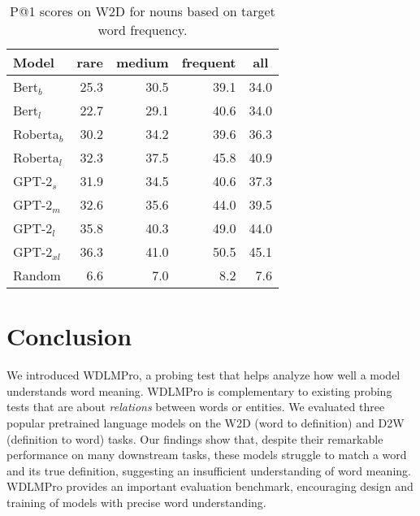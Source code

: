 \documentclass[11pt,a4paper]{article}
\begin{document}
\begin{table}
    \centering
    \begin{tabular}{l|rrrr}
    \hline
         \textbf{Model} & \multicolumn{1}{c}{\textbf{rare}} & \multicolumn{1}{c}{\textbf{medium}} & \multicolumn{1}{c}{\textbf{frequent}} & \multicolumn{1}{c}{\textbf{all}} \\ \hline
     Bert$_{b}$ & 25.3 & 30.5 & 39.1 & 34.0 \\
     Bert$_{l}$ & 22.7 & 29.1 & 40.6 & 34.0 \\
     Roberta$_{b}$ & 30.2 & 34.2 & 39.6 & 36.3 \\
     Roberta$_{l}$ & 32.3 & 37.5 & 45.8 & 40.9 \\ \hline
     GPT-2$_{s}$ & 31.9 & 34.5 & 40.6 & 37.3 \\
     GPT-2$_{m}$ & 32.6 & 35.6 & 44.0 & 39.5 \\
     GPT-2$_{l}$ & 35.8 & 40.3 & 49.0 & 44.0 \\
     GPT-2$_{xl}$ & 36.3 & 41.0 & 50.5 & 45.1 \\ \hline
     Random & 6.6 & 7.0 & 8.2 & 7.6 \\ \hline 
     
    \end{tabular}
    \caption{P@1 scores on W2D for nouns based on target word frequency.}
    \label{tab:freq_results_W2D}
\end{table}



\section{Conclusion}
We introduced
WDLMPro,
a
probing test that helps  analyze  how well a model
understands word meaning. WDLMPro is complementary to existing
probing tests that are about
\emph{relations} between words or entities.
We evaluated three popular pretrained language
models on the W2D (word to definition) and D2W (definition
to word) tasks. Our findings show
that, despite their remarkable performance on many
downstream tasks, these models struggle to match a word and
its true definition, suggesting an insufficient
understanding of word meaning. WDLMPro provides an important
evaluation benchmark, encouraging design and training of
models with precise word understanding.




\appendix
\end{document}
